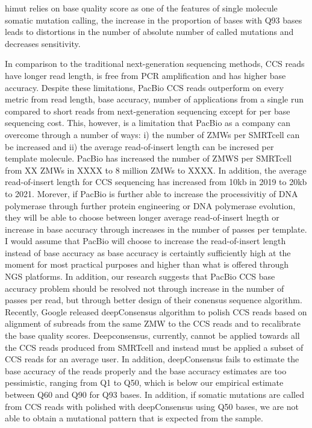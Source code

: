 himut relies on base quality score as one of the features of single molecule somatic mutation calling, the increase in the proportion of bases with Q93 bases leads to distortions in the number of absolute number of called mutations and decreases sensitivity.

In comparison to the traditional next-generation sequencing methods, CCS reads have longer read length, is free from PCR amplification and has higher base accuracy. Despite these limitations, PacBio CCS reads outperform on every metric from read length, base accuracy, number of applications from a single run compared to short reads from next-generation sequencing except for per base sequencing cost. This, however, is a limitation that PacBio as a company can overcome through a number of ways: i) the number of ZMWs per SMRTcell can be increased and ii) the average read-of-insert length can be incresed per template molecule. PacBio has increased the number of ZMWS per SMRTcell from XX ZMWs in XXXX to 8 million ZMWs to XXXX. In addition, the average read-of-insert length for CCS sequencing has increased from 10kb in 2019 to 20kb to 2021. Morever, if PacBio is further able to increase the processivitiy of DNA polymerase through further protein engineering or DNA polymerase evolution, they will be able to choose between longer average read-of-insert lnegth or increase in base accuracy through increases in the number of passes per template. I would assume that PacBio will choose to increase the read-of-insert length instead of base accuracy as base accuracy is certaintly sufficiently high at the moment for most practical purposes and higher than what is offered through NGS platforms. In addition, our research suggests that PacBio CCS base accuracy problem should be resolved not through increase in the number of passes per read, but through better design of their conensus sequence algorithm. Recently, Google released deepConsensus algorithm to polish CCS reads based on alignment of subreads from the same ZMW to the CCS reads and to recalibrate the base quality scores. Deepconsensus, currently, cannot be applied towards all the CCS reads produced from SMRTcell and instead must be applied a subset of CCS reads for an average user. In addition, deepConsensus fails to estimate the base accuracy of the reads properly and the base accuracy estimates are too pessimistic, ranging from Q1 to Q50, which is below our empirical estimate between Q60 and Q90 for Q93 bases. In addition, if somatic mutations are called from CCS reads with polished with deepConsensus using Q50 bases, we are not able to obtain a mutational pattern that is expected from the sample.



